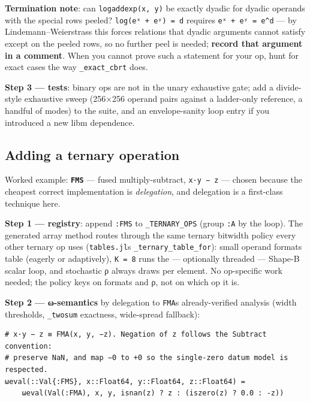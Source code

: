 \textbf{Termination note}: can \texttt{logaddexp(x, y)} be exactly dyadic for dyadic operands with the special rows peeled? \texttt{log(eˣ + eʸ) = d} requires \texttt{eˣ + eʸ = e{\textasciicircum}d} — by Lindemann–Weierstrass this forces relations that dyadic arguments cannot satisfy except on the peeled rows, so no further peel is needed; \textbf{record that argument in a comment}. When you cannot prove such a statement for your op, hunt for exact cases the way \texttt{\_exact\_cbrt} does.



\textbf{Step 3 — tests}: binary ops are not in the unary exhaustive gate; add a divide-style exhaustive sweep (256×256 operand pairs against a ladder-only reference, a handful of modes) to the suite, and an envelope-sanity loop entry if you introduced a new libm dependence.



\subsection{Adding a ternary operation}



\label{10687193682775408327}{}


Worked example: \textbf{\texttt{FMS}} — fused multiply-subtract, \texttt{x·y − z} — chosen because the cheapest correct implementation is \emph{delegation}, and delegation is a first-class technique here.



\textbf{Step 1 — registry}: append \texttt{:FMS} to \texttt{\_TERNARY\_OPS} (group \texttt{:A} by the loop). The generated array method routes through the same ternary bitwidth policy every other ternary op uses (\texttt{tables.jl}{\textquotesingle}s \texttt{\_ternary\_table\_for}): small operand formats table (eagerly or adaptively), \texttt{K = 8} runs the — optionally threaded — Shape-B scalar loop, and stochastic ρ always draws per element. No op-specific work needed; the policy keys on formats and ρ, not on which op it is.



\textbf{Step 2 — ω-semantics} by delegation to \texttt{FMA}{\textquotesingle}s already-verified analysis (width thresholds, \texttt{\_twosum} exactness, wide-spread fallback):




\begin{verbatim}
# x·y − z ≡ FMA(x, y, −z). Negation of z follows the Subtract convention:
# preserve NaN, and map −0 to +0 so the single-zero datum model is respected.
ωeval(::Val{:FMS}, x::Float64, y::Float64, z::Float64) =
    ωeval(Val(:FMA), x, y, isnan(z) ? z : (iszero(z) ? 0.0 : -z))
\end{verbatim}



